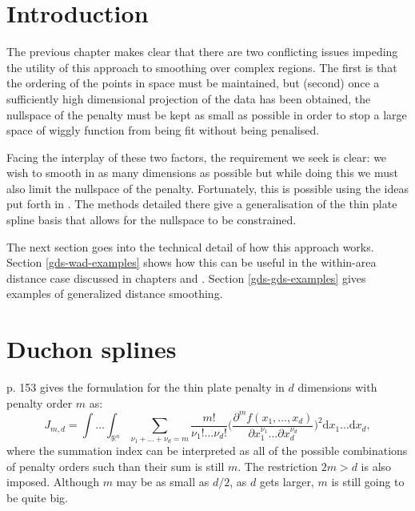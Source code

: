 
\label{chap-gds}


\section{Introduction}

The previous chapter makes clear that there are two conflicting issues impeding the utility of this approach to smoothing over complex regions. The first is that the ordering of the points in space must be maintained, but (second) once a sufficiently high dimensional projection of the data has been obtained, the nullspace of the penalty must be kept as small as possible in order to stop a large space of wiggly function from being fit without being penalised.

Facing the interplay of these two factors, the requirement we seek is clear: we wish to smooth in as many dimensions as possible but while doing this we must also limit the nullspace of the penalty. Fortunately, this is possible using the ideas put forth in \cite{duchon77}. The methods detailed there give a generalisation of the thin plate spline basis that allows for the nullspace to be constrained.

The next section goes into the technical detail of how this approach works. Section \ref{gds-wad-examples} shows how this can be useful in the within-area distance case discussed in chapters \label{chap-sc} and \label{chap-mds}. Section \ref{gds-gds-examples} gives examples of generalized distance smoothing.

\section{Duchon splines}

\cite{simonbook} p. 153 gives the formulation for the thin plate penalty in $d$ dimensions with penalty order $m$ as:
\begin{equation}
J_{m,d} = \int \ldots \int_{\mathbb{R}^n} \sum_{\nu_1 + \dots + \nu_d=m} \frac{m!}{\nu_1! \dots \nu_d!}\Big( \frac{\partial^m f(x_1,\dots,x_d)}{\partial x_1^{\nu_1} \ldots  \partial x_d^{\nu_d}} \Big)^2 \text{d} x_1 \ldots  \text{d} x_d,
\label{tprs-pen}
\end{equation}
where the summation index can be interpreted as all of the possible combinations of penalty orders such than their sum is still $m$. The restriction $2m>d$ is also imposed. Although $m$ may be as small as $d/2$, as $d$ gets larger, $m$ is still going to be quite big.

